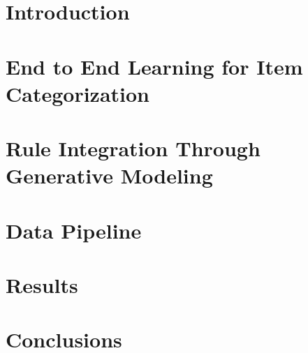 \documentclass[sigconf]{acmart}
\begin{document}




\maketitle

\section{Introduction}


\section{End to End Learning for Item Categorization}


\section{Rule Integration Through Generative Modeling}


\section{Data Pipeline}


\section{Results}


\section{Conclusions}





\end{document}
